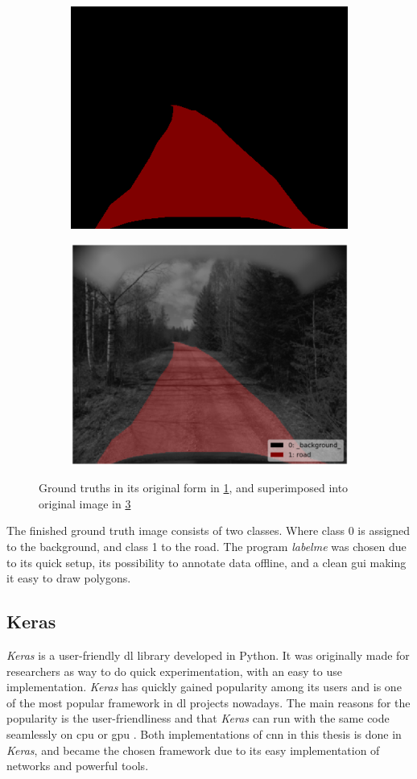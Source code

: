 \documentclass[USenglish]{ifimaster}  %
\begin{document}
\begin{figure}[H]
\begin{subfigure}{.6\textwidth}
\includegraphics[width=.6\linewidth]{bilder/label_method.png}
\label{fig:gt_method}
\end{subfigure}
\hspace*{\fill} %
\begin{subfigure}{.6\textwidth}
\includegraphics[width=.6\linewidth]{bilder/label_viz_method.png}
\label{fig:superimposed_method}
\end{subfigure}
\caption{Ground truths in its original form in \cref{fig:gt_method}, and superimposed into original image in \cref{fig:superimposed_method}}
\end{figure}

The finished ground truth image consists of two classes. Where class 0 is assigned to the background, and class 1 to the road. The program \textit{labelme} was chosen due to its quick setup, its possibility to annotate data offline, and a clean \ac{gui} making it easy to draw polygons. 
 
\subsection{Keras}
\textit{Keras} is a user-friendly \ac{dl} library developed in Python. It was originally made for researchers as way to do quick experimentation, with an easy to use implementation. \textit{Keras} has quickly gained popularity among its users and is one of the most popular framework in \ac{dl} projects nowadays. The main reasons for the popularity is the user-friendliness and that \textit{Keras} can run with the same code seamlessly on \ac{cpu} or \ac{gpu} \cite{Francois_Deep_learning_with_python}. Both implementations of \ac{cnn} in this thesis is done in \textit{Keras}, and became the chosen framework due to its easy implementation of networks and powerful tools.
\end{document}
